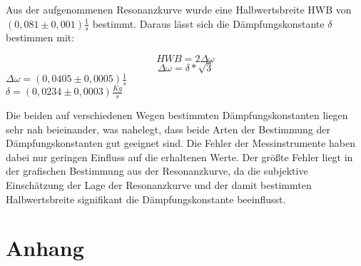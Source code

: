 \documentclass[11pt]{article}
\begin{document}
Aus der aufgenommenen Resonanzkurve wurde eine Halbwertsbreite HWB von $(0,081\pm 0,001)\frac{1}{s}$ bestimmt. Daraus lässt sich die Dämpfungskonstante $\delta$ bestimmen mit:
\begin{center}
$$HWB=2\Delta\omega$$
$$\Delta\omega = \delta*\sqrt{3}$$
$\Delta\omega=(0,0405\pm 0,0005)\frac{1}{s}$\\
$\delta=(0,0234\pm 0,0003)\frac{Kg}{s}$\\
\end{center}

Die beiden auf verschiedenen Wegen bestimmten Dämpfungskonstanten liegen sehr nah beieinander, was nahelegt, dass beide Arten der Bestimmung der Dämpfungskonstanten gut geeignet sind. Die Fehler der Messinstrumente haben dabei nur geringen Einfluss auf die erhaltenen Werte. Der größte Fehler liegt in der grafischen Bestimmung aus der Resonanzkurve, da die subjektive Einschätzung der Lage der Resonanzkurve und der damit bestimmten Halbwertsbreite signifikant die Dämpfungskonstante beeinflusst.  

\section{Anhang}





\end{document}
